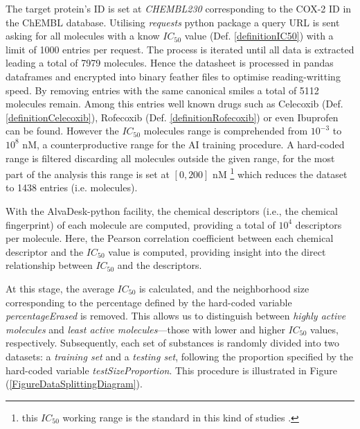 \documentclass[12pt,letterpaper]{article}
\begin{document}
\begin{multicols}{2}
The target protein's ID is set at \emph{CHEMBL230} corresponding to the COX-2 ID in the ChEMBL database. Utilising \emph{requests} python package\cite{PythonPackageRequests} a query URL is sent asking for all molecules with a know $IC_{50}$ value (Def. \ref{definitionIC50}) with a limit of 1000 entries per request. The process is iterated until all data is extracted leading a total of 7979 molecules. Hence the datasheet is processed in pandas dataframes\cite{PythonPackagePandas} and encrypted into binary feather files to optimise reading-writting speed. By removing entries with the same canonical smiles a total of 5112 molecules remain. Among this entries well known drugs such as Celecoxib (Def. \ref{definitionCelecoxib}), Rofecoxib (Def. \ref{definitionRofecoxib}) or even Ibuprofen can be found. However the $IC_{50}$ molecules range is comprehended from $10^{-3}$ to $10^{8}$ nM, a counterproductive range for the AI training procedure. A hard-coded range is filtered discarding all molecules outside the given range, for the most part of the analysis this range is set at $[0,200]$ nM \footnote{this $IC_{50}$ working range is the standard in this kind of studies \cite{MachineLearningPaper5Lipoxygenase}.} which reduces the dataset to 1438 entries (i.e. molecules). \par 
With the AlvaDesk-python \cite{AlvaDescSecondPaper} facility, the chemical descriptors (i.e., the chemical fingerprint) of each molecule are computed, providing a total of $10^4$ descriptors per molecule. Here, the Pearson correlation coefficient between each chemical descriptor and the $IC_{50}$ value is computed, providing insight into the direct relationship between $IC_{50}$ and the descriptors.

At this stage, the average $IC_{50}$ is calculated, and the neighborhood size corresponding to the percentage defined by the hard-coded variable \emph{percentageErased} is removed. This allows us to distinguish between \emph{highly active molecules} and \emph{least active molecules}—those with lower and higher $IC_{50}$ values, respectively. Subsequently, each set of substances is randomly divided into two datasets: a \emph{training set} and a \emph{testing set}, following the proportion specified by the hard-coded variable \emph{testSizeProportion}. This procedure is illustrated in Figure (\ref{FigureDataSplittingDiagram}).
\end{multicols}
\end{document}
